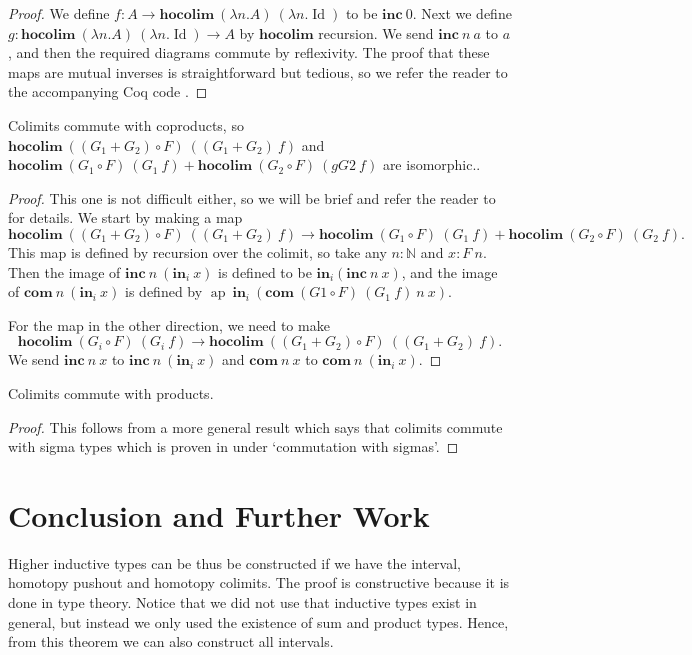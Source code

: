 \documentclass[a4paper,UKenglish]{lipics-v2016}
\newcommand{\Boperator}[1]{\mathrm{\mathbf{#1}}}
\newcommand{\inn}{\Boperator{in}}
\newcommand{\ap}[0]{\operatorname{ap}}
\newcommand{\hocolim}[0]{\Boperator{hocolim}}
\newcommand{\inc}[0]{\Boperator{inc}}
\newcommand{\com}[0]{\Boperator{com}}
\begin{document}
\begin{proof}
We define $f : A \rightarrow \hocolim \> (\lambda n . A) \> (\lambda n . \operatorname{Id})$ to be $\inc \> 0$.
Next we define $g : \hocolim \> (\lambda n . A) \> (\lambda n . \operatorname{Id}) \rightarrow A$ by $\hocolim$ recursion.
We send $\inc \> n \> a$ to $a$, and then the required diagrams commute by reflexivity.
The proof that these maps are mutual inverses is straightforward but tedious, so we refer the reader to the accompanying Coq code \cite{CoqImpl}.
\end{proof}

\begin{lemma}
\label{lem:colimsum}
Colimits commute with coproducts, so $\hocolim \> ((G_1 + G_2) \circ F) \> ((G_1 + G_2) \> f)$ and $\hocolim \> (G_1 \circ F) \> (G_1 \> f) + \hocolim \> (G_2 \circ F) \> (gG2 \> f)$ are isomorphic.. 
\end{lemma}

\begin{proof}
This one is not difficult either, so we will be brief and refer the reader to \cite{CoqImpl} for details.
We start by making a map 
\[
\hocolim \> ((G_1 + G_2) \circ F) \> ((G_1 + G_2) \> f) \rightarrow \hocolim \> (G_1 \circ F) \> (G_1 \> f) + \hocolim \> (G_2 \circ F) \> (G_2 \> f).
\]
This map is defined by recursion over the colimit, so take any $n : \mathbb{N}$ and $x : F \> n$.
Then the image of $\inc \> n \> (\inn_i \> x)$ is defined to be $\inn_i (\inc \> n \> x)$, and the image of $\com \> n \> (\inn_i \> x)$ is defined by
$\ap \> \inn_i \> (\com \> (G1 \circ F) \> (G_1 \> f) \> n \> x)$.

For the map in the other direction, we need to make 
\[
\hocolim \> (G_i \circ F) \> (G_i \> f) \rightarrow \hocolim \> ((G_1 + G_2) \circ F) \> ((G_1 + G_2) \> f).
\]
We send $\inc \> n \> x$ to $\inc \> n \> (\inn_i \> x)$ and $\com \> n \> x$ to $\com \> n \> (\inn_i \> x)$.
\end{proof}

\begin{lemma}
\label{lem:colimprod}
Colimits commute with products.
\end{lemma}

\begin{proof}
This follows from a more general result which says that colimits commute with sigma types which is proven in \cite{boulier2015colimites,boulier2016} under `commutation with sigmas'.
\end{proof}

\section{Conclusion and Further Work}
Higher inductive types can be thus be constructed if we have the interval, homotopy pushout and homotopy colimits.
The proof is constructive because it is done in type theory.
Notice that we did not use that inductive types exist in general, but instead we only used the existence of sum and product types.
Hence, from this theorem we can also construct all intervals.
\end{document}
